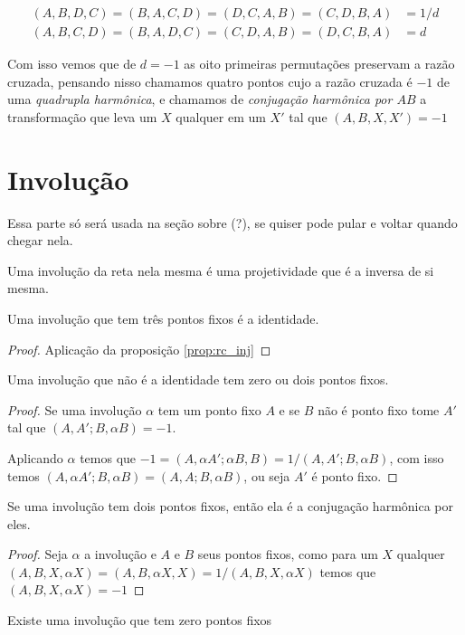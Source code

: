 \begin{align*}
    (A,B,D,C) = (B,A,C,D) = (D,C,A,B) = (C,D,B,A) &=
    1/d \\
    (A,B,C,D) = (B,A,D,C) = (C,D,A,B) =  (D,C,B,A) &= d
\end{align*}

Com isso vemos que de $d = -1$ as oito primeiras permutações preservam a razão cruzada, pensando nisso chamamos quatro pontos cujo a razão cruzada é $-1$ de uma \emph{quadrupla harmônica}, e chamamos de \emph{conjugação harmônica por $AB$} a transformação que leva um $X$ qualquer em um $X'$ tal que $(A,B,X,X') = -1$
\section{Involução}

Essa parte só será usada na seção sobre (?), se quiser pode pular e voltar quando chegar nela.

\begin{defn}
Uma involução da reta nela mesma é uma projetividade que é a inversa de si mesma.
\end{defn}

\begin{prop}
Uma involução que tem três pontos fixos é a identidade.
\end{prop}

\begin{proof}
Aplicação da proposição \ref{prop:rc_inj}
\end{proof}

\begin{thm}
Uma involução que não é a identidade tem zero ou dois pontos fixos. 
\end{thm}

\begin{proof}
Se uma involução $\alpha$ tem um ponto fixo $A$ e se $B$ não é ponto fixo tome $A'$ tal que $(A,A';B,\alpha B) = -1$.

Aplicando $\alpha$ temos que $-1 = (A,\alpha A';\alpha B, B) = 1/(A,A';B,\alpha B)$, com isso temos $(A,\alpha A'; B,\alpha B) = (A,A;B,\alpha B)$, ou seja $A'$ é ponto fixo.
\end{proof}

\begin{thm}
Se uma involução tem dois pontos fixos, então ela é a conjugação harmônica por eles.
\end{thm}

\begin{proof}
Seja $\alpha$ a involução e $A$ e $B$ seus pontos fixos, como para um $X$ qualquer $(A,B,X,\alpha X) = (A,B,\alpha X, X) = 1/(A,B,X,\alpha X)$ temos que $(A,B,X,\alpha X) = -1$
\end{proof}

\begin{prop}
  Existe uma involução que tem zero pontos fixos
\end{prop}
